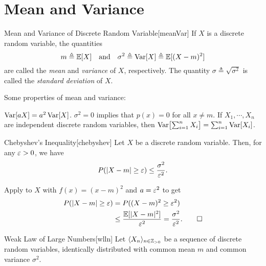\documentclass[../probability.tex]{subfiles}
\begin{document}
\section{Mean and Variance}

\begin{Definition}{Mean and Variance of Discrete Random Variable}[meanVar]
    If \(X\) is a discrete random variable, the quantities
    \[
        m \triangleq \mathbb{E}[X]\quad\text{and}\quad
        \sigma^2 \triangleq \operatorname{Var}[X] \triangleq \mathbb{E}[(X - m)^2]
    \]
    are called the \emph{mean} and \emph{variance} of \(X\), respectively.
    The quantity \(\sigma \triangleq \sqrt{\sigma^2}\) is called the
    \emph{standard deviation} of \(X\).
\end{Definition}

\begin{note}
    Some properties of mean and variance:
    \begin{itemize}
        \ii
        \(\operatorname{Var}[aX] = a^2 \operatorname{Var}[X]\).
        \ii
        \(\sigma^2 = 0\) implies that
        \(p(x) = 0\) for all \(x \neq m\).
        \ii
        If \(X_1, \cdots, X_n\) are independent discrete random variables,
        then \(\operatorname{Var} \bigl[ \sum_{i=1}^n X_i \bigr] = \sum_{i=1}^n \operatorname{Var}[X_i]\).
    \end{itemize}
\end{note}

\begin{Theorem}{Chebyshev's Inequality}[chebyshev]
    Let \(X\) be a discrete random variable. Then,
    for any \(\varepsilon > 0\), we have
    \[
        P(|X-m| \ge \varepsilon) \le \frac{\sigma^2}{\varepsilon^2}\text.
    \]
\end{Theorem}
\begin{myproof}[Proof]
    Apply  to \(X\) with \(f(x) = (x-m)^2\) and \(a = \varepsilon^2\) to get
    \begin{align*}
        P(|X-m| \ge \varepsilon)
        &= P((X-m)^2 \ge \varepsilon^2) \\
        &\le \frac{\mathbb{E}[|X-m|^2]}{\varepsilon^2}
        = \frac{\sigma^2}{\varepsilon^2}\text. \qedhere
    \end{align*}
\end{myproof}

\begin{Theorem}{Weak Law of Large Numbers}[wlln]
    Let \(\lang X_n \rang_{n \in \ZZ_{>0}}\) be a sequence of discrete random variables,
    identically distributed with common mean \(m\) and common variance \(\sigma^2\).
\end{Theorem}

\end{document}
